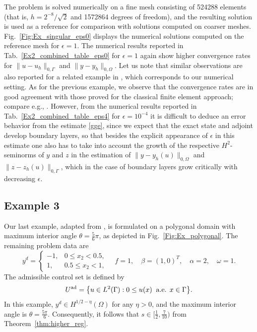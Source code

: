 \documentclass[a4paper,10pt]{article}
\newcommand{\Uad}{{U^{\textup{ad}}}}
\numberwithin{theorem}{section}
\newcommand{\x}[2][blue]{#2}
\begin{document}
The problem is solved numerically on a fine mesh consisting of 524288 elements (that is, $h=2^{-8}/\sqrt{2}$ and 1572864 degrees of freedom), and the resulting solution is used as a reference for comparison with solutions computed on coarser meshes. Fig.~\ref{Fig:Ex_singular_eps0} displays the numerical solutions computed on the reference mesh for $\epsilon=1$. \x{The numerical results reported in Tab.~\ref{Ex2_combined_table_eps0} for $\epsilon=1$
again show higher convergence rates for $\|u-u_h\|_{0,\Gamma}$ and $\|y-y_h\|_{0,\Omega}$. Let us note that similar observations are also reported for a related example in \cite[Tab.4]{WGong_WHu_MMateos_JSingler_XZhang_YZhang_2018}, which corresponds to our numerical setting. As for the previous example, we observe that the convergence rates are in good agreement with those proved for the classical finite element approach; compare e.g., \cite[Example~3]{SMay_RRannacher_BVexler_2013}. However, from the numerical results reported in Tab.~\ref{Ex2_combined_table_eps4} for $\epsilon=10^{-4}$ it is difficult to deduce an error behavior from the estimate \eqref{gge}, since we expect that the exact state and adjoint develop boundary layers, so that besides the explicit appearance of $\epsilon$ in this estimate one also has to take into account the growth of the respective $H^2$-seminorms of $y$ and $z$ in the estimation of $\|y-y_h(u)\|_{0,\Omega}$ and $\|z-z_h(u)\|_{0,\Gamma}$, which in the case of boundary layers grow critically with decreasing $\epsilon$.}




\subsection{Example 3}\label{Ex_polygonal}

Our last example, adapted from \cite[Example~2]{SMay_RRannacher_BVexler_2013}, is formulated on a polygonal domain with maximum interior angle $\theta = \frac{5}{6} \pi$, as depicted in Fig.~\ref{Fig:Ex_polygonal}.  The remaining problem data are
\[
y^d = \begin{cases}
-1, & 0 \leq x_2 < 0.5, \\
1, & 0.5 \leq x_2 < 1,
\end{cases}
\quad
f = 1, \quad \beta = (1,0)^T, \quad \alpha = 2, \quad \omega = 1.
\]
The admissible control set is defined by
\[
\Uad = \bigl\{ u \in L^2(\Gamma) : 0 \leq u(x) \;\; \text{a.e. } x \in \Gamma \bigr\}.
\]
In this example, $y^d \in H^{1/2-\eta}(\Omega)$ for any $\eta>0$, and the maximum interior angle is $\theta = \frac{5\pi}{6}$. Consequently, it follows that $s \in [\frac{1}{2},\frac{7}{10})$ from Theorem~\ref{thm:higher_reg}.
\end{document}
